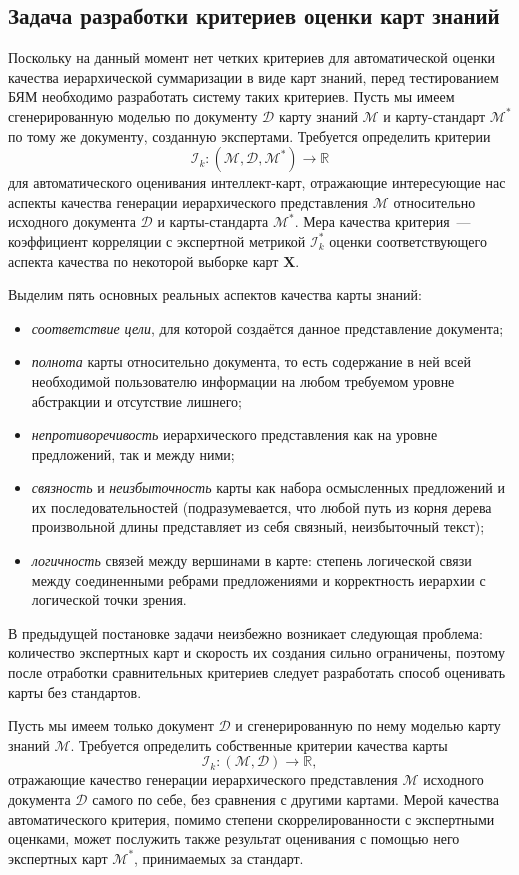 \documentclass[12pt]{article}
\newcommand{\X}{\mathbf{X}}
\newcommand{\D}{\mathcal{D}}
\newcommand{\M}{\mathcal{M}}
\newcommand{\I}{\mathcal{I}}
\newcommand{\R}{\mathbb{R}}
\begin{document}
\subsection{Задача разработки критериев оценки карт знаний}
Поскольку на данный момент нет четких критериев для автоматической оценки качества иерархической суммаризации в виде карт знаний, перед тестированием БЯМ необходимо разработать систему таких критериев. Пусть мы имеем сгенерированную моделью по документу $\D$ карту знаний $\M$ и карту-стандарт $\M^*$ по тому же документу, созданную экспертами. 
Требуется определить критерии $$\I_k: (\M, \D, \M^*) \rightarrow \R$$ для автоматического оценивания интеллект-карт, отражающие интересующие нас аспекты качества генерации иерархического представления $\M$ относительно исходного документа $\D$ и карты-стандарта $\M^*$. 
Мера качества критерия~--- коэффициент корреляции с экспертной метрикой $\I^*_k$ оценки соответствующего аспекта качества по некоторой выборке карт $\X$. 

Выделим пять основных реальных аспектов качества карты знаний:
\begin{itemize}
    \item \textit{соответствие цели}, для которой создаётся данное представление документа;
    \item \textit{полнота} карты относительно документа, то есть содержание в ней всей необходимой пользователю информации на любом требуемом уровне абстракции и отсутствие лишнего;
    \item \textit{непротиворечивость} иерархического представления как на уровне предложений, так и между ними;
    \item \textit{связность} и \textit{неизбыточность} карты как набора осмысленных предложений и их последовательностей (подразумевается, что любой путь из корня дерева произвольной длины представляет из себя связный, неизбыточный текст);
    \item \textit{логичность} связей между вершинами в карте: степень логической связи между соединенными ребрами предложениями и корректность иерархии с логической точки зрения. 
\end{itemize}

В предыдущей постановке задачи неизбежно возникает следующая проблема: количество экспертных карт и скорость их создания сильно ограничены, поэтому после отработки сравнительных критериев следует разработать способ оценивать карты без стандартов. 

Пусть мы имеем только документ $\D$ и сгенерированную по нему моделью карту знаний $\M$. Требуется определить собственные критерии качества карты
$$\I_k: (\M, \D) \rightarrow \R,$$ 
отражающие качество генерации иерархического представления $\M$ исходного документа $\D$ самого по себе, без сравнения с другими картами. Мерой качества автоматического критерия, помимо степени скоррелированности с экспертными оценками, может послужить также результат оценивания с помощью него экспертных карт $\M^*$, принимаемых за стандарт.
\end{document}
